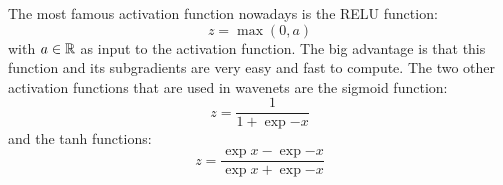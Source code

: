 The most famous activation function nowadays is the RELU function:
\begin{equation}\label{eq:nn_theory_relu}
  z = \max{(0, a)}
\end{equation}
with $a \in \mathbb{R}$ as input to the activation function.
The big advantage is that this function and its subgradients are very easy and fast to compute.
The two other activation functions that are used in wavenets are the sigmoid function:
\begin{equation}\label{eq:nn_theory_sigmoid}
  z = \frac{1}{1 + \exp{-x}}
\end{equation}
and the tanh functions:
\begin{equation}\label{eq:nn_theory_tanh}
  z = \frac{\exp{x} - \exp{-x}}{\exp{x} + \exp{-x}}
\end{equation}



